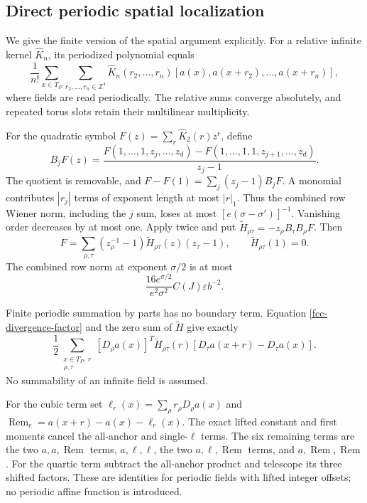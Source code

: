\subsection{Direct periodic spatial localization}
\label{fcc-periodic-spatial-section}

We give the finite version of the spatial argument explicitly.
For a relative infinite kernel \(\widehat K_n\), its
periodized polynomial equals
\begin{equation}
 \frac1{n!}\sum_{x\in T_P}
  \sum_{r_2,\ldots,r_n\in\mathbb Z^4}
   \widehat K_n(r_2,\ldots,r_n)
       [a(x),a(x+r_2),\ldots,a(x+r_n)],
 \label{fcc-periodic-polynomial}
\end{equation}
where fields are read periodically. The relative sums
converge absolutely, and repeated torus slots retain
their multilinear multiplicity.

For the quadratic symbol \(F(z)=\sum_r\widehat K_2(r)z^r\),
define
\[
 B_jF(z)=
 \frac{F(1,\ldots,1,z_j,\ldots,z_d)
       -F(1,\ldots,1,1,z_{j+1},\ldots,z_d)}{z_j-1}.
\]
The quotient is removable, and
\(F-F(1)=\sum_j(z_j-1)B_jF\). A monomial contributes
\(|r_j|\) terms of exponent length at most \(|r|_1\).
Thus the combined row Wiener norm, including the \(j\)
sum, loses at most \([e(\sigma-\sigma')]^{-1}\).
Vanishing order decreases by at most one. Apply twice
and put \(\widetilde H_{\rho\tau}=-z_\rho B_\tau B_\rho F\).
Then
\begin{equation}
 F=\sum_{\rho,\tau}(z_\rho^{-1}-1)
          \widetilde H_{\rho\tau}(z)(z_\tau-1),
 \qquad \widetilde H_{\rho\tau}(1)=0.
 \label{fcc-divergence-factor}
\end{equation}
The combined row norm at exponent \(\sigma/2\) is at
most
\[
 \frac{16e^{\sigma/2}}{e^2\sigma^2}
                  C(J)\varepsilon b^{-2}.
\]

Finite periodic summation by parts has no boundary term.
Equation \eqref{fcc-divergence-factor} and the zero sum
of \(\widetilde H\) give exactly
\begin{equation}
 \frac12\sum_{\substack{x\in T_P,\,r\\\rho,\tau}}
 [D_\rho a(x)]^T\widetilde H_{\rho\tau}(r)
                [D_\tau a(x+r)-D_\tau a(x)].
 \label{fcc-periodic-ibp}
\end{equation}
No summability of an infinite field is assumed.

For the cubic term set
\(\ell_r(x)=\sum_\rho r_\rho D_\rho a(x)\) and
\(\operatorname{Rem}_r=a(x+r)-a(x)-\ell_r(x)\).
The exact lifted constant and first moments cancel
the all-anchor and single-\(\ell\) terms. The six
remaining terms are the two \(a,a,\operatorname{Rem}\)
terms, \(a,\ell,\ell\), the two
\(a,\ell,\operatorname{Rem}\) terms, and
\(a,\operatorname{Rem},\operatorname{Rem}\).
For the quartic term subtract the all-anchor product
and telescope its three shifted factors. These are
identities for periodic fields with lifted integer
offsets; no periodic affine function is introduced.

